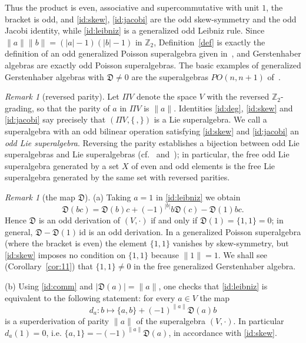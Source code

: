 \documentclass[11pt,reqno]{amsart}
\newcommand{\Z}{\mathbb Z}
\newcommand{\D}{\mathfrak D}
\newcommand{\rp}[1]{\|#1\|}
\theoremstyle{plain}
\theoremstyle{definition}
\theoremstyle{remark}
\newtheorem{remark}[theorem]{Remark}
\begin{document}
Thus the product is even, associative and supercommutative with unit $1$, the bracket is odd, and \eqref{id:skew}, \eqref{id:jacobi} are the odd skew-symmetry and the odd Jacobi identity, while \eqref{id:leibniz} is a generalized odd Leibniz rule.
Since $\rp a\rp b=(|a|-1)(|b|-1)$ in $\Z_2$, Definition~\ref{def} is exactly the definition of an odd generalized Poisson superalgebra given in~\cite[(0.14)]{CK10}, and Gerstenhaber algebras are exactly odd Poisson superalgebras.
The basic examples of generalized Gerstenhaber algebras with $\D\neq0$ are the superalgebras $PO(n,n+1)$ of~\cite{CK10}.

\begin{remark}[reversed parity]\label{rem:parity}
Let $\Pi V$ denote the space $V$ with the reversed $\Z_2$-grading, so that the parity of $a$ in $\Pi V$ is $\rp a$.
Identities \eqref{id:deg}, \eqref{id:skew} and \eqref{id:jacobi} say precisely that $(\Pi V,\{\,,\})$ is a Lie superalgebra.
We call a superalgebra with an odd bilinear operation satisfying \eqref{id:skew} and \eqref{id:jacobi} an \emph{odd Lie superalgebra}.
Reversing the parity establishes a bijection between odd Lie superalgebras and Lie superalgebras (cf.~\cite{Kac77} and~\cite[Remark~1.3]{CK10}); in particular, the free odd Lie superalgebra generated by a set $X$ of even and odd elements is the free Lie superalgebra generated by the same set with reversed parities.
\end{remark}

\begin{remark}[the map $\D$]\label{rem:D}
(a) Taking $a=1$ in \eqref{id:leibniz} we obtain
\begin{equation}\label{Dprod}
\D(bc)=\D(b)c+(-1)^{|b|}b\D(c)-\D(1)bc .
\end{equation}
Hence $\D$ is an odd derivation of $(V,\cdot)$ if and only if $\D(1)=\{1,1\}=0$; in general, $\D-\D(1)\,\mathrm{id}$ is an odd derivation.
In a generalized Poisson superalgebra (where the bracket is even) the element $\{1,1\}$ vanishes by skew-symmetry, but \eqref{id:skew} imposes no condition on $\{1,1\}$ because $\rp 1=1$.
We shall see (Corollary~\ref{cor:11}) that $\{1,1\}\neq0$ in the free generalized Gerstenhaber algebra.

(b) Using \eqref{id:comm} and $|\D(a)|=\rp a$, one checks that \eqref{id:leibniz} is equivalent to the following statement: for every $a\in V$ the map
$$
d_a\colon b\mapsto \{a,b\}+(-1)^{\rp a}\D(a)b
$$
is a superderivation of parity $\rp a$ of the superalgebra $(V,\cdot)$.
In particular $d_a(1)=0$, i.e. $\{a,1\}=-(-1)^{\rp a}\D(a)$, in accordance with \eqref{id:skew}.
\end{remark}
\end{document}
